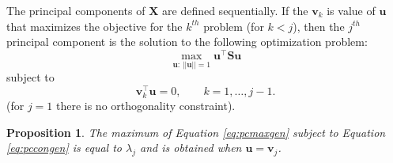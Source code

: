\documentclass[
]{book}
\newtheorem{proposition}{Proposition}[chapter]
\theoremstyle{definition}
\theoremstyle{definition}
\theoremstyle{definition}
\theoremstyle{definition}
\theoremstyle{remark}
\begin{document}
The principal components of \(\mathbf X\) are defined sequentially. If the \(\mathbf v_k\) is value of \(\mathbf u\) that maximizes the objective for the \(k^{th}\) problem (for \(k<j\)), then the \(j^{th}\) principal component is the solution to the following optimization problem:
\begin{equation}
\max_{\mathbf u: \, \vert \vert \mathbf u\vert \vert =1}\mathbf u^\top \mathbf S\mathbf u
\label{eq:pcmaxgen}
\end{equation}
subject to
\begin{equation}
\mathbf v_k^\top \mathbf u=0, \qquad k=1, \ldots , j-1.
\label{eq:pccongen}
\end{equation}
(for \(j=1\) there is no orthogonality constraint).

\begin{proposition}
\protect\hypertarget{prp:pca1}{}\label{prp:pca1}The maximum of Equation \eqref{eq:pcmaxgen}
subject to Equation \eqref{eq:pccongen} is equal to \(\lambda_j\) and is obtained when \(\mathbf u=\mathbf v_j\).
\end{proposition}
\end{document}
